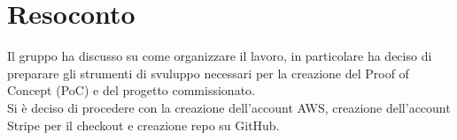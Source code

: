 \section{Resoconto}

Il gruppo ha discusso su come organizzare il lavoro, in particolare ha deciso di preparare gli strumenti di svuluppo necessari per la creazione del Proof of Concept (PoC) e del progetto commissionato.\\
Si è deciso di procedere con la creazione dell'account AWS, creazione dell'account Stripe per il checkout e creazione repo su GitHub.